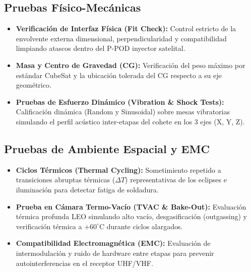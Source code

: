 \subsection{Pruebas Físico-Mecánicas}
\begin{itemize}
    \item \textbf{Verificación de Interfaz Física (Fit Check):} Control estricto de la envolvente externa dimensional, perpendicularidad y compatibilidad limpiando atascos dentro del P-POD inyector satelital.
    \item \textbf{Masa y Centro de Gravedad (CG):} Verificación del peso máximo por estándar CubeSat y la ubicación tolerada del CG respecto a su eje geométrico.
    \item \textbf{Pruebas de Esfuerzo Dinámico (Vibration \& Shock Tests):} Calificación dinámica (Random y Sinusoidal) sobre mesas vibratorias simulando el perfil acústico inter-etapas del cohete en los 3 ejes (X, Y, Z).
\end{itemize}

\subsection{Pruebas de Ambiente Espacial y EMC}
\begin{itemize}
    \item \textbf{Ciclos Térmicos (Thermal Cycling):} Sometimiento repetido a transiciones abruptas térmicas ($\Delta T$) representativas de los eclipses e iluminación para detectar fatiga de soldadura.
    \item \textbf{Prueba en Cámara Termo-Vacío (TVAC \& Bake-Out):} Evaluación térmica profunda LEO simulando alto vacío, desgasificación (outgassing) y verificación térmica a $+60^\circ\text{C}$ durante ciclos alargados.
    \item \textbf{Compatibilidad Electromagnética (EMC):} Evaluación de intermodulación y ruido de hardware entre etapas para prevenir autointerferencias en el receptor UHF/VHF.
\end{itemize}
